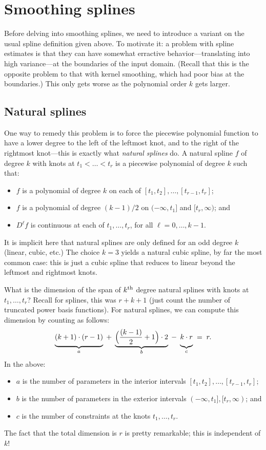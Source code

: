 \documentclass{article}
\begin{document}
\section{Smoothing splines}

Before delving into smoothing splines, we need to introduce a variant on the
usual spline definition given above. To motivate it: a problem with spline
estimates is that they can have somewhat erractive behavior---translating into
high variance---at the boundaries of the input domain. (Recall that this is the
opposite problem to that with kernel smoothing, which had poor bias at the
boundaries.) This only gets worse as the polynomial order $k$ gets larger.   

\subsection{Natural splines}

One way to remedy this problem is to force the piecewise polynomial function to
have a lower degree to the left of the leftmost knot, and to the right of the
rightmost knot---this is exactly what \emph{natural splines} do. A natural
spline $f$ of degree $k$ with knots at $t_1 < \dots < t_r$ is a piecewise
polynomial of degree $k$ such that:
\begin{itemize}
\item $f$ is a polynomial of degree $k$ on each of $[t_1,t_2], \dots,
  [t_{r-1},t_r]$; 
\item $f$ is a polynomial of degree $(k-1)/2$ on $(-\infty,t_1]$ and
  $[t_r,\infty)$; and 
\item $D^\ell f$ is continuous at each of $t_1,\dots,t_r$, for all
  $\ell=0,\dots,k-1$. 
\end{itemize}
It is implicit here that natural splines are only defined for an odd degree $k$
(linear, cubic, etc.) The choice $k=3$ yields a natural cubic spline, by far the
most common case: this is just a cubic spline that reduces to linear beyond the 
leftmost and rightmost knots.     

What is the dimension of the span of $k^{\text{th}}$ degree natural splines with knots at
$t_1,\dots,t_r$? Recall for splines, this was $r+k+1$ (just count the number of
truncated power basis functions). For natural splines, we can compute this
dimension by counting as follows:  
\[
\underbrace{\vphantom{\Big(\Big)} (k+1)\cdot(r-1)}_{a} \;+\; 
\underbrace{\Big(\frac{(k-1)}{2}+1\Big) \cdot 2}_{b} \;-\;
\underbrace{\vphantom{\Big(\Big)} k \cdot r}_{c} \;=\; r. 
\]
In the above: 
\begin{itemize}
\item $a$ is the number of parameters in the interior intervals $[t_1,t_2],
  \dots, [t_{r-1},t_r]$; 
\item $b$ is the number of parameters in the exterior intervals $(-\infty,t_1],
  [t_r,\infty)$; and 
\item $c$ is the number of constraints at the knots $t_1,\dots,t_r$.  
\end{itemize}
The fact that the total dimension is $r$ is pretty remarkable; this is
independent of $k$!   
\end{document}

